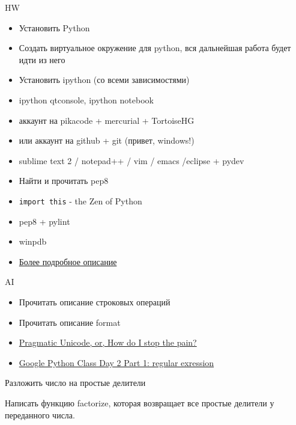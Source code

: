 \documentclass{article}
\begin{document}
\LARGE

\begin{center} HW \end{center}
\begin{itemize}
    \item Установить Python
    \item Создать виртуальное окружение для python, 
            вся дальнейшая работа будет идти из него
    \item Установить ipython (со всеми зависимостями)
    \item ipython qtconsole, ipython notebook
    \item аккаунт на pikacode + mercurial + TortoiseHG
    \item или аккаунт на github + git (привет, windows!)
    \item sublime text 2 / notepad++ / vim / emacs /eclipse + pydev
    \item Найти и прочитать pep8
    \item \lstinline!import this! - the Zen of Python
    \item pep8 + pylint
    \item winpdb
    \item \href{http://koder-ua.blogspot.com/2012/09/blog-post.html}{Более подробное описание}
\end{itemize}
\newpage

\begin{center} AI \end{center}
\begin{itemize}
    \item Прочитать описание строковых операций
    \item Прочитать описание format
    \item \href{http://www.youtube.com/watch?feature=player_embedded&v=sgHbC6udIqc}{Pragmatic Unicode, or, How do I stop the pain?}
    \item \href{http://www.youtube.com/watch?v=kWyoYtvJpe4}{Google Python Class Day 2 Part 1: regular exression}
\end{itemize}


\begin{center} Разложить число на простые делители \end{center}
Написать функцию factorize, которая возвращает все простые делители
у переданного числа.
\newpage
\end{document}
